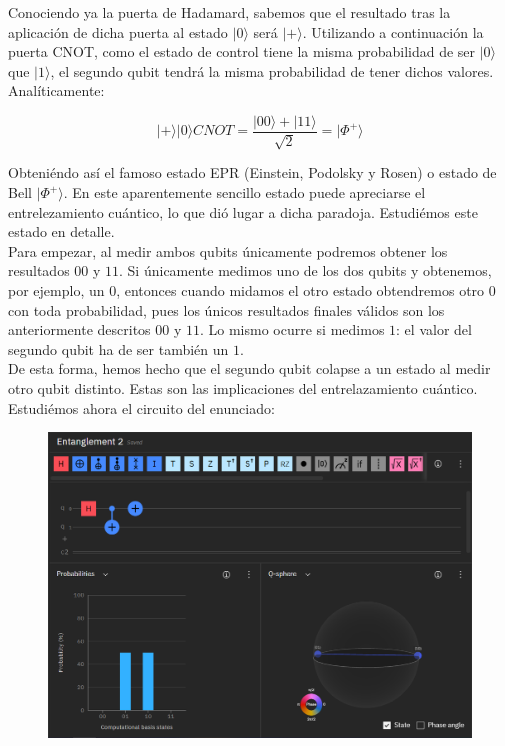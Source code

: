 \documentclass[11pt]{article}
\newcommand{\ra}{\rangle}
\theoremstyle{plain}
\newcounter{enunciado}
\begin{document}
Conociendo ya la puerta de Hadamard, sabemos que el resultado tras la aplicación de dicha puerta al estado $|0\ra$ será $|+\ra$. Utilizando a continuación la puerta CNOT, como el estado de control tiene la misma probabilidad de ser $|0\ra$ que $|1\ra$, el segundo qubit tendrá la misma probabilidad de tener dichos valores. Analíticamente:

\[
	|+\ra|0\ra CNOT = \frac{|00\ra + |11\ra}{\sqrt 2} = |\Phi^+\ra
\]

Obteniéndo así el famoso estado EPR (Einstein, Podolsky y Rosen) o estado de Bell $|\Phi^+\ra$. En este aparentemente sencillo estado puede apreciarse el entrelezamiento cuántico, lo que dió lugar a dicha paradoja. Estudiémos este estado en detalle. \\

Para empezar, al medir ambos qubits únicamente podremos obtener los resultados $00$ y $11$. Si únicamente medimos uno de los dos qubits y obtenemos, por ejemplo, un $0$, entonces cuando midamos el otro estado obtendremos otro $0$ con toda probabilidad, pues los únicos resultados finales válidos son los anteriormente descritos $00$ y $11$. Lo mismo ocurre si medimos $1$: el valor del segundo qubit ha de ser también un $1$. \\

De esta forma, hemos hecho que el segundo qubit colapse a un estado al medir otro qubit distinto. Estas son las implicaciones del entrelazamiento cuántico. \\

Estudiémos ahora el circuito del enunciado:

\begin{figure}[H]
	\centering
	\includegraphics[scale=0.6]{figures/entanglement2.png}
\end{figure}
\end{document}
